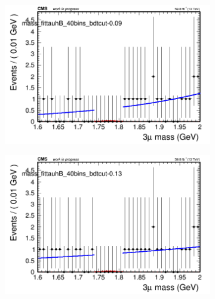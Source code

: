 \begin{figure}[H]
\begin{subfigure}{0.2\textwidth}
        \caption{}
    \end{subfigure}
    \begin{subfigure}{0.2\textwidth}
        \includegraphics[width=\textwidth]{unfixed_exp/plots/tauhB/massfit_tauhB_40bins_bdtcut-0.09.png}
        \caption{}
    \end{subfigure}
    \begin{subfigure}{0.2\textwidth}
        \includegraphics[width=\textwidth]{unfixed_exp/plots/tauhB/massfit_tauhB_40bins_bdtcut-0.13.png}
        \caption{}
    \end{subfigure}
    \begin{subfigure}{0.2\textwidth}

\end{subfigure}
\end{figure}

